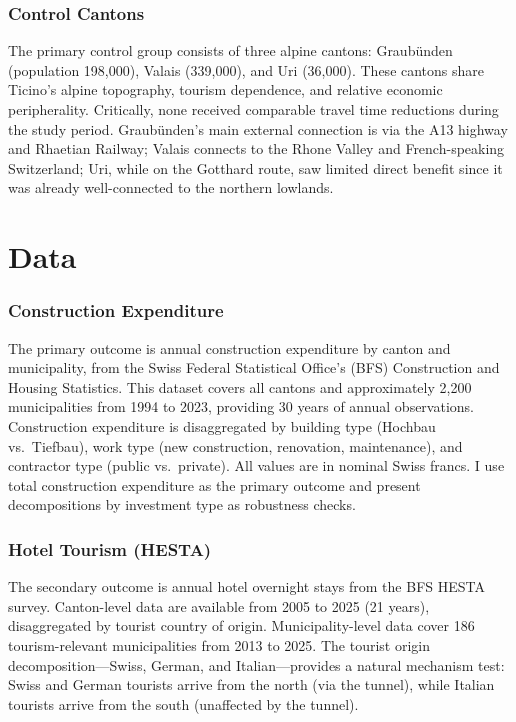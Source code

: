 \documentclass[12pt]{article}
\begin{document}
\subsubsection*{Control Cantons} The primary control group consists of three alpine cantons: Graub\"unden (population 198,000), Valais (339,000), and Uri (36,000). These cantons share Ticino's alpine topography, tourism dependence, and relative economic peripherality. Critically, none received comparable travel time reductions during the study period. Graub\"unden's main external connection is via the A13 highway and Rhaetian Railway; Valais connects to the Rhone Valley and French-speaking Switzerland; Uri, while on the Gotthard route, saw limited direct benefit since it was already well-connected to the northern lowlands.

\section{Data}

\subsubsection*{Construction Expenditure} The primary outcome is annual construction expenditure by canton and municipality, from the Swiss Federal Statistical Office's (BFS) Construction and Housing Statistics. This dataset covers all cantons and approximately 2,200 municipalities from 1994 to 2023, providing 30 years of annual observations. Construction expenditure is disaggregated by building type (Hochbau vs.\ Tiefbau), work type (new construction, renovation, maintenance), and contractor type (public vs.\ private). All values are in nominal Swiss francs. I use total construction expenditure as the primary outcome and present decompositions by investment type as robustness checks.

\subsubsection*{Hotel Tourism (HESTA)} The secondary outcome is annual hotel overnight stays from the BFS HESTA survey. Canton-level data are available from 2005 to 2025 (21 years), disaggregated by tourist country of origin. Municipality-level data cover 186 tourism-relevant municipalities from 2013 to 2025. The tourist origin decomposition---Swiss, German, and Italian---provides a natural mechanism test: Swiss and German tourists arrive from the north (via the tunnel), while Italian tourists arrive from the south (unaffected by the tunnel).
\end{document}
